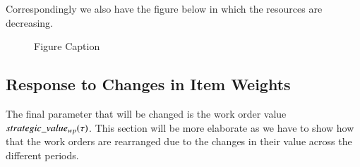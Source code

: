 Correspondingly we also have the figure below in which the resources are decreasing.

\begin{figure}[H]%
	\centering
	\resizebox{\linewidth}{!}{
		
	}
	\caption{Figure Caption}\label{fig:results:objective-resource-decreases}
\end{figure}



\subsection{Response to Changes in Item Weights}
The final parameter that will be changed is the work order value $strategic\_value_{w p}(\tau)$. This section will be more elaborate as we have to show how that the
work orders are rearranged due to the changes in their value across the different periods.

